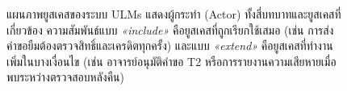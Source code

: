 \begin{figure}[p]
  \centering
  \resizebox{\textwidth}{!}{%
  }
  \caption{แผนภาพยูสเคสของระบบ ULMs แสดงผู้กระทำ (Actor) ทั้งสี่บทบาทและยูสเคสที่เกี่ยวข้อง
    ความสัมพันธ์แบบ \emph{«include»} คือยูสเคสที่ถูกเรียกใช้เสมอ (เช่น การส่งคำขอยืมต้องตรวจสิทธิ์และเครดิตทุกครั้ง)
    และแบบ \emph{«extend»} คือยูสเคสที่ทำงานเพิ่มในบางเงื่อนไข (เช่น อาจารย์อนุมัติคำขอ T2 หรือการรายงานความเสียหายเมื่อพบระหว่างตรวจสอบหลังคืน)}
  \label{fig:usecase}
\end{figure}
